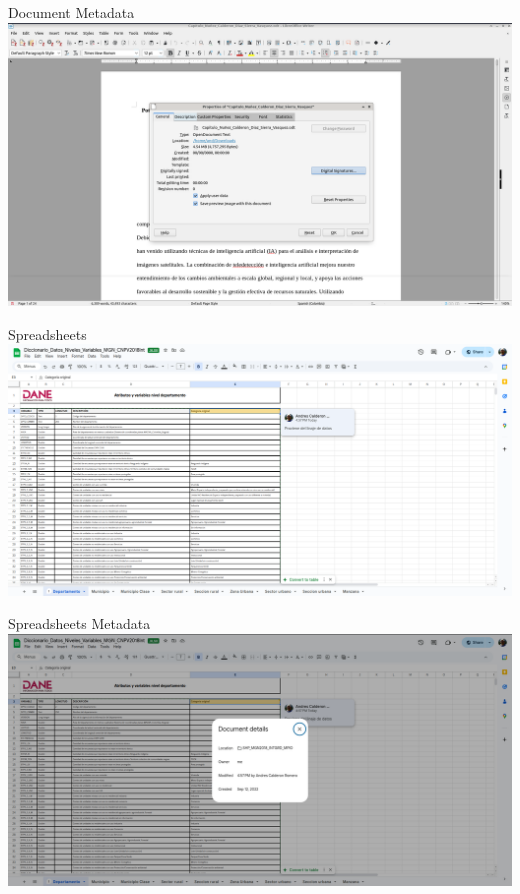 \documentclass{beamer}
\begin{document}
\begin{frame}{Document Metadata}
    \centering
    \includegraphics[width=\textwidth]{figures/documentmeta}
\end{frame}
\begin{frame}{Spreadsheets}
    \centering
    \includegraphics[width=\textwidth]{figures/spreadsheet}
\end{frame}
\begin{frame}{Spreadsheets Metadata}
    \centering
    \includegraphics[width=\textwidth]{figures/spreadsheetmeta}
\end{frame}
\end{document}
